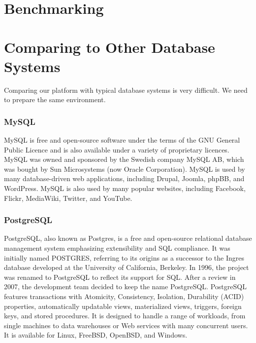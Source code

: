 \section{Benchmarking}
\label{benchmark}
\section{Comparing to Other Database Systems}
Comparing our platform with typical database systems is very difficult. We need to prepare the same environment.

\subsubsection{MySQL}
MySQL is free and open-source software under the terms of the GNU General Public Licence and is also available under a variety of proprietary licences. MySQL was owned and sponsored by the Swedish company MySQL AB, which was bought by Sun Microsystems (now Oracle Corporation). MySQL is used by many database-driven web applications, including Drupal, Joomla, phpBB, and WordPress. MySQL is also used by many popular websites, including Facebook, Flickr, MediaWiki, Twitter, and YouTube. \cite{mysql2001mysql, dubois1999mysql}

\subsubsection{PostgreSQL}
PostgreSQL, also known as Postgres, is a free and open-source relational database management system emphasizing extensibility and SQL compliance. It was initially named POSTGRES, referring to its origins as a successor to the Ingres database developed at the University of California, Berkeley. In 1996, the project was renamed to PostgreSQL to reflect its support for SQL. After a review in 2007, the development team decided to keep the name PostgreSQL. PostgreSQL features transactions with Atomicity, Consistency, Isolation, Durability (ACID) properties, automatically updatable views, materialized views, triggers, foreign keys, and stored procedures. It is designed to handle a range of workloads, from single machines to data warehouses or Web services with many concurrent users. It is available for Linux, FreeBSD, OpenBSD, and Windows. \cite{drake2002practical}

